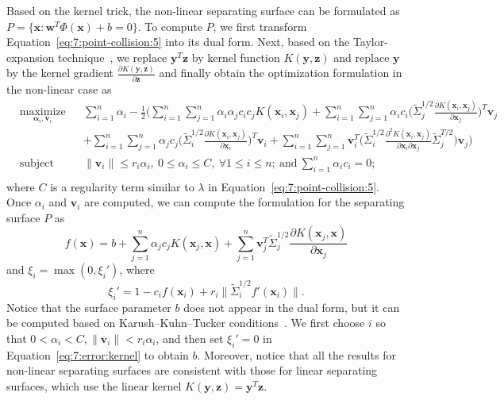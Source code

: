 Based on the kernel trick, the non-linear separating surface can be formulated as $P = \{\mathbf x: \mathbf w^T \Phi(\mathbf x) + b = 0\}$. To compute $P$,
we first transform Equation~\ref{eq:7:point-collision:5} into its dual form. Next, based on the Taylor-expansion technique~\cite{Bi:2005}, we replace $\mathbf y^T \mathbf z$ by kernel function $K(\mathbf y, \mathbf z)$ and
replace $\mathbf y$ by the kernel gradient $\frac{\partial K(\mathbf y, \mathbf z)}{\partial \mathbf z}$ and finally obtain the optimization formulation in the non-linear case as
\begin{equation}
\label{eq:7:point-collision:6}
\begin{aligned}
	& \underset{\mathbf \alpha_i, \mathbf v_i}{\text{maximize}}
	& & \sum_{i=1}^n \alpha_i - \frac{1}{2}\Big( \sum_{i=1}^n \sum_{j=1}^n \alpha_i \alpha_j c_i c_j K(\mathbf x_i, \mathbf x_j) + \sum_{i=1}^n \sum_{j=1}^n \alpha_i c_i \big( \widetilde{\Sigma}_j^{1/2} \frac{\partial K(\mathbf x_i, \mathbf x_j)}{\partial \mathbf x_j}\big)^T \mathbf v_j  \\
    & & &  + \sum_{i=1}^n \sum_{j=1}^n \alpha_j c_j \big( \widetilde{\Sigma}_i^{1/2} \frac{\partial K(\mathbf x_i, \mathbf x_j)}{\partial \mathbf x_i}\big)^T \mathbf v_i + \sum_{i=1}^n \sum_{j=1}^n \mathbf v_i^T \big( \widetilde{\Sigma}_i^{1/2} \frac{\partial^2 K(\mathbf x_i, \mathbf x_j)}{\partial \mathbf x_i \partial \mathbf x_j} \widetilde{\Sigma}_j^{T/2}\big) \mathbf v_j \Big) \\
	& \text{subject to}
	& & \|\mathbf v_i\| \leq r_i \alpha_i, \ 0 \leq \alpha_i \leq C, \ \forall 1 \leq i \leq n; \ \text{and} \ \sum_{i=1}^n \alpha_i c_i = 0;  \\
	\end{aligned}
	\end{equation}
where $C$ is a regularity term similar to $\lambda$ in Equation~\ref{eq:7:point-collision:5}. Once $\alpha_i$ and $\mathbf v_i$ are computed, we can compute
the formulation for the separating surface $P$ as
\begin{equation}
f(\mathbf x) = b + \sum_{j=1}^n \alpha_j c_j K(\mathbf x_j, \mathbf x) + \sum_{j=1}^n \mathbf v_j^T \widetilde{\Sigma}_j^{1/2} \frac{\partial K(\mathbf x_j, \mathbf x)}{\partial \mathbf x_j}
\end{equation}
and $\xi_i = \max(0, \xi_i')$, where
\begin{equation}
\label{eq:7:error:kernel}
\xi_i' = 1 - c_i f(\mathbf x_i) + r_i \|\widetilde{\Sigma}_i^{1/2} f'(\mathbf x_i)\|.
\end{equation}
Notice that the surface parameter $b$ does not appear in the dual form, but it can be computed based on Karush--Kuhn--Tucker conditions~\cite{CC01a}.
We first choose $i$ so that $0 < \alpha_i < C, \|\mathbf v_i \| < r_i \alpha_i$, and then set $\xi_i' = 0$ in Equation~\ref{eq:7:error:kernel} to obtain $b$.
Moreover, notice that all the results for non-linear separating surfaces are consistent with those for linear separating surfaces, which use the
linear kernel $K(\mathbf y, \mathbf z) = \mathbf y^T \mathbf z$.


